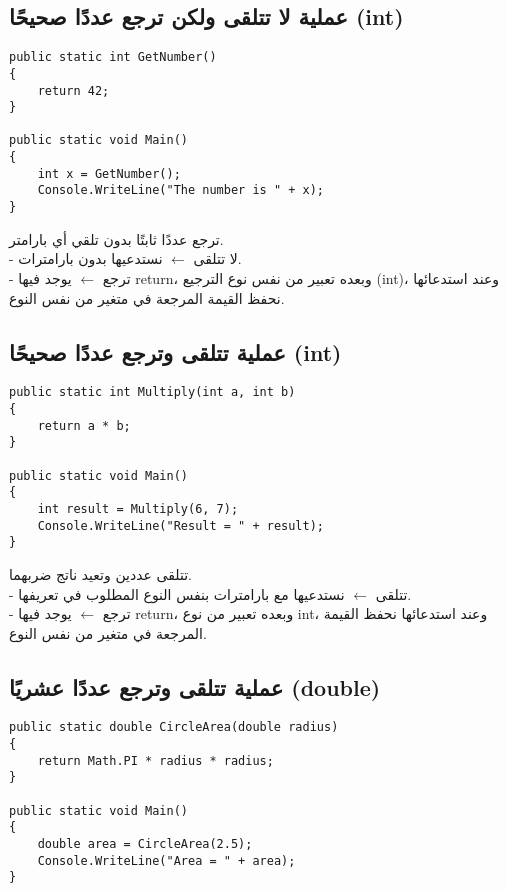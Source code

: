 \documentclass[12pt]{article}
\begin{document}
\subsection{عملية لا تتلقى ولكن ترجع عددًا صحيحًا (\textenglish{int})}
\begin{boxExample}
\begin{english}
\begin{verbatim}
public static int GetNumber()
{
    return 42;
}

public static void Main()
{
    int x = GetNumber();
    Console.WriteLine("The number is " + x);
}
\end{verbatim}
\end{english}
\end{boxExample}

ترجع عددًا ثابتًا بدون تلقي أي بارامتر. \\
- لا تتلقى $\leftarrow$ نستدعيها بدون بارامترات. \\
- ترجع $\leftarrow$ يوجد فيها \textenglish{return}، وبعده تعبير من نفس نوع الترجيع (\textenglish{int})،
  وعند استدعائها نحفظ القيمة المرجعة في متغير من نفس النوع.



\subsection{عملية تتلقى وترجع عددًا صحيحًا (\textenglish{int})}
\begin{boxExample}
\begin{english}
\begin{verbatim}
public static int Multiply(int a, int b)
{
    return a * b;
}

public static void Main()
{
    int result = Multiply(6, 7);
    Console.WriteLine("Result = " + result);
}
\end{verbatim}
\end{english}
\end{boxExample}

تتلقى عددين وتعيد ناتج ضربهما. \\
- تتلقى $\leftarrow$ نستدعيها مع بارامترات بنفس النوع المطلوب في تعريفها. \\
- ترجع $\leftarrow$ يوجد فيها \textenglish{return}، وبعده تعبير من نوع \textenglish{int}،
  وعند استدعائها نحفظ القيمة المرجعة في متغير من نفس النوع.



\subsection{عملية تتلقى وترجع عددًا عشريًا (\textenglish{double})}
\begin{boxExample}
\begin{english}
\begin{verbatim}
public static double CircleArea(double radius)
{
    return Math.PI * radius * radius;
}

public static void Main()
{
    double area = CircleArea(2.5);
    Console.WriteLine("Area = " + area);
}
\end{verbatim}
\end{english}
\end{boxExample}
\end{document}
